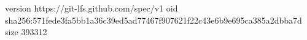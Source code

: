 version https://git-lfs.github.com/spec/v1
oid sha256:571fede3fa5bb1a36c39ed5ad77467f907621f22c43e6b9e695ca385a2dbba7d
size 393312
